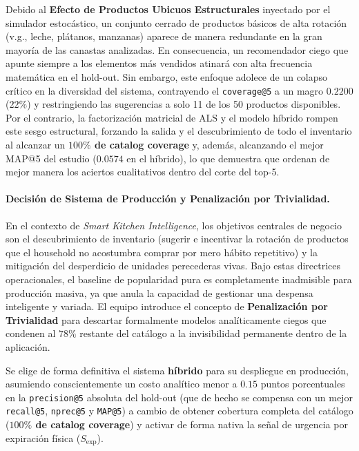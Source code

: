 \documentclass[12pt,a4paper]{article}
\newcommand{\metric}[1]{\textcolor{metricblue}{\textbf{#1}}}
\newcommand{\winner}[1]{\textcolor{successgreen}{\textbf{#1}}}
\newcommand{\code}[1]{\texttt{\small #1}}
\begin{document}
Debido al \textbf{Efecto de Productos Ubicuos Estructurales} inyectado por el simulador estocástico, un conjunto cerrado de productos básicos de alta rotación (v.g., leche, plátanos, manzanas) aparece de manera redundante en la gran mayoría de las canastas analizadas. En consecuencia, un recomendador ciego que apunte siempre a los elementos más vendidos atinará con alta frecuencia matemática en el hold-out. Sin embargo, este enfoque adolece de un colapso crítico en la diversidad del sistema, contrayendo el \code{coverage@5} a un magro $0.2200$ ($22\%$) y restringiendo las sugerencias a solo 11 de los 50 productos disponibles. Por el contrario, la factorización matricial de ALS y el modelo híbrido rompen este sesgo estructural, forzando la salida y el descubrimiento de todo el inventario al alcanzar un \metric{$100\%$ de catalog coverage} y, además, alcanzando el mejor MAP@5 del estudio ($0.0574$ en el híbrido), lo que demuestra que ordenan de mejor manera los aciertos cualitativos dentro del corte del top-5.

\paragraph{Decisión de Sistema de Producción y Penalización por Trivialidad.} 
En el contexto de \textit{Smart Kitchen Intelligence}, los objetivos centrales de negocio son el descubrimiento de inventario (sugerir e incentivar la rotación de productos que el household no acostumbra comprar por mero hábito repetitivo) y la mitigación del desperdicio de unidades perecederas vivas. Bajo estas directrices operacionales, el baseline de popularidad pura es completamente inadmisible para producción masiva, ya que anula la capacidad de gestionar una despensa inteligente y variada. El equipo introduce el concepto de \textbf{Penalización por Trivialidad} para descartar formalmente modelos analíticamente ciegos que condenen al $78\%$ restante del catálogo a la invisibilidad permanente dentro de la aplicación. 

Se elige de forma definitiva el sistema \winner{híbrido} para su despliegue en producción, asumiendo conscientemente un costo analítico menor a $0.15$ puntos porcentuales en la \code{precision@5} absoluta del hold-out (que de hecho se compensa con un mejor \code{recall@5}, \code{nprec@5} y \code{MAP@5}) a cambio de obtener cobertura completa del catálogo (\metric{$100\%$ de catalog coverage}) y activar de forma nativa la señal de urgencia por expiración física ($S_{\text{exp}}$).
\end{document}
